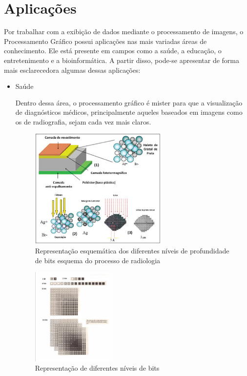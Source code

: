 \documentclass{article}
\begin{document}
\section{Aplicações}
Por trabalhar com a exibição de dados mediante o processamento de imagens, o Processamento Gráfico possui aplicações nas mais variadas áreas de conhecimento. Ele está presente em campos como a saúde, a educação, o entretenimento e a bioinformática\cite{WinNT}. A partir disso, pode-se apresentar de forma mais esclarecedora algumas dessas aplicações:

\begin{itemize}
    \item Saúde 
    
    Dentro dessa área, o processamento gráfico é mister para que a visualização de diagnósticos médicos, principalmente aqueles baseados em imagens como os de radiografia, sejam cada vez mais claros. 
    
    \begin{figure}[H]
        \centering
        \includegraphics[width=68mm,scale=0.5]{images/radio.jpg}
        \caption{Representação esquemática dos diferentes níveis de profundidade de bits
esquema do processo de radiologia
 \cite{goto2013identificaccao}}
        \label{fig:esquema_radio}
    \end{figure}
    
    \begin{figure}[H]
        \centering
        \includegraphics[width=42mm,scale=0.5]{images/bitradio.png}
        \caption{Representação de diferentes níveis de bits}
        \label{fig:bits}
    \end{figure}
    

\end{itemize}
\end{document}

